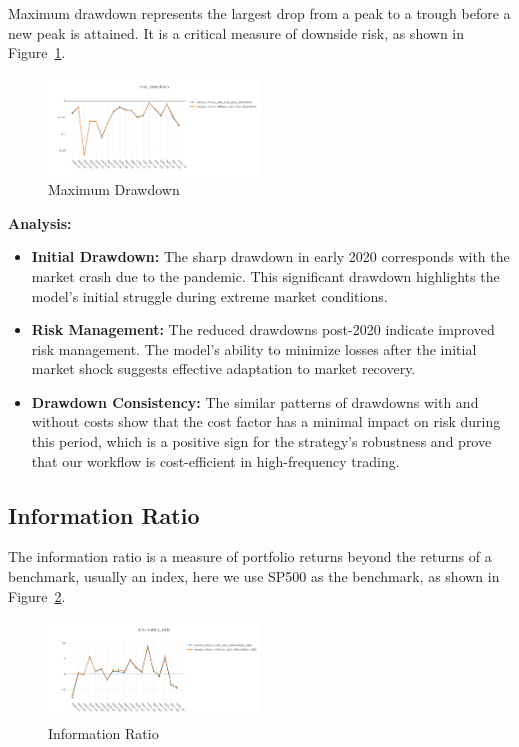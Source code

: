 \documentclass[conference]{IEEEtran}
\begin{document}
Maximum drawdown represents the largest drop from a peak to a trough before a new peak is attained. It is a critical measure of downside risk, as shown in Figure~\ref{fig:maximum drawdown}.

\begin{figure}[h!]
\centering
    \includegraphics[width=0.5\textwidth]{max_drawdown.png}
    \caption{Maximum Drawdown}
    \label{fig:maximum drawdown}
\end{figure}

\textbf{Analysis:}
\begin{itemize}
    \item \textbf{Initial Drawdown:} The sharp drawdown in early 2020 corresponds with the market crash due to the pandemic. This significant drawdown highlights the model's initial struggle during extreme market conditions.
    \item \textbf{Risk Management:} The reduced drawdowns post-2020 indicate improved risk management. The model's ability to minimize losses after the initial market shock suggests effective adaptation to market recovery.
    \item \textbf{Drawdown Consistency:} The similar patterns of drawdowns with and without costs show that the cost factor has a minimal impact on risk during this period, which is a positive sign for the strategy's robustness and prove that our workflow is cost-efficient in high-frequency trading.
\end{itemize}

\begin{center}
    \subsection*{\textbf{Information Ratio}}
\end{center}

The information ratio is a measure of portfolio returns beyond the returns of a benchmark, usually an index, here we use SP500 as the benchmark, as shown in Figure~\ref{fig:information ratio}.

\begin{figure}[h!]
\centering
    \includegraphics[width=0.5\textwidth]{information_ratio.png}
    \caption{Information Ratio}
    \label{fig:information ratio}
\end{figure}
\end{document}

